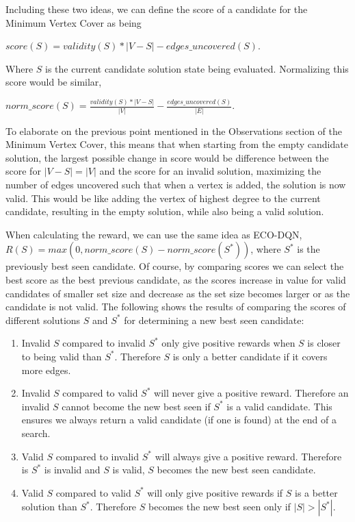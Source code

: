 \documentclass{article}
\begin{document}
Including these two ideas, we can define the score of a candidate for the Minimum Vertex Cover as being 

$score(S) = validity(S) * |V - S| - edges\_uncovered(S)$. 

Where $S$ is the current candidate solution state being evaluated. Normalizing this score would be similar,

$norm\_score(S) = \frac{validity(S) * |V - S|}{|V|} - \frac{edges\_uncovered(S)}{|E|}$. 

To elaborate on the previous point mentioned in the Observations section of the Minimum Vertex Cover, this means that when starting from the empty candidate solution, the largest possible change in score would be difference between the score for $|V - S| = |V|$ and the score for an invalid solution, maximizing the number of edges uncovered such that when a vertex is added, the solution is now valid. This would be like adding the vertex of highest degree to the current candidate, resulting in the empty solution, while also being a valid solution. 

When calculating the reward, we can use the same idea as ECO-DQN, $R(S) = max(0, norm\_score(S) - norm\_score(S^*))$, where $S^*$ is the previously best seen candidate. Of course, by comparing scores we can select the best score as the best previous candidate, as the scores increase in value for valid candidates of smaller set size and decrease as the set size becomes larger or as the candidate is not valid. The following shows the results of comparing the scores of different solutions $S$ and $S^*$ for determining a new best seen candidate:

\begin{enumerate}
    \item Invalid $S$ compared to invalid $S^*$ only give positive rewards when $S$ is closer to being valid than $S^*$. Therefore $S$ is only a better candidate if it covers more edges.
    \item Invalid $S$ compared to valid $S^*$ will never give a positive reward. Therefore an invalid $S$ cannot become the new best seen if $S^*$ is a valid candidate. This ensures we always return a valid candidate (if one is found) at the end of a search.
    \item Valid $S$ compared to invalid $S^*$ will always give a positive reward. Therefore is $S^*$ is invalid and $S$ is valid, $S$ becomes the new best seen candidate.
    \item Valid $S$ compared to valid $S^*$ will only give positive rewards if $S$ is a better solution than $S^*$. Therefore $S$ becomes the new best seen only if $|S| > |S^*|$.
\end{enumerate}
\end{document}
